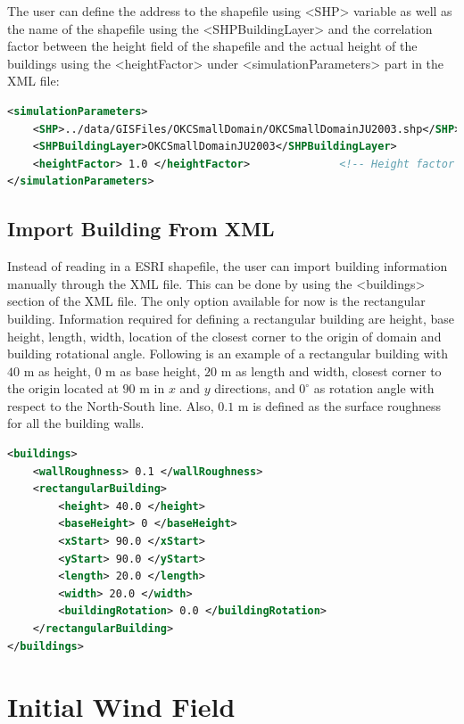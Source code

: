 The user can define the address to the shapefile using <SHP> variable as well as the name of the shapefile using the <SHPBuildingLayer> and the correlation factor between the height field of the shapefile and the actual height of the buildings using the <heightFactor> under <simulationParameters> part in the XML file:

\begin{lstlisting}[language=XML]
<simulationParameters>
  	<SHP>../data/GISFiles/OKCSmallDomain/OKCSmallDomainJU2003.shp</SHP>	<!-- Address to shapefile location-->
  	<SHPBuildingLayer>OKCSmallDomainJU2003</SHPBuildingLayer>
  	<heightFactor> 1.0 </heightFactor>				<!-- Height factor multiplied by the building height read in from the shapefile (default = 1.0)-->
</simulationParameters>
\end{lstlisting}

\subsection{Import Building From XML}
\label{sec:building}

Instead of reading in a ESRI shapefile, the user can import building information manually through the XML file. This can be done by using the <buildings> section of the XML file. The only option available for now is the rectangular building. Information required for defining a rectangular building are height, base height, length, width, location of the closest corner to the origin of domain and building rotational angle. Following is an example of a rectangular building with $40$ m as height, $0$ m as base height, $20$ m as length and width, closest corner to the origin located at $90$ m in $x$ and $y$ directions, and $0^{\circ}$ as rotation angle with respect to the North-South line. Also, $0.1$ m is defined as the surface roughness for all the building walls.

\begin{lstlisting}[language=XML]
<buildings>
	<wallRoughness> 0.1 </wallRoughness>
	<rectangularBuilding>
		<height> 40.0 </height>
		<baseHeight> 0 </baseHeight>
		<xStart> 90.0 </xStart>
		<yStart> 90.0 </yStart>
		<length> 20.0 </length>
		<width> 20.0 </width>
		<buildingRotation> 0.0 </buildingRotation>
	</rectangularBuilding>
</buildings>
\end{lstlisting}

\section{Initial Wind Field}

